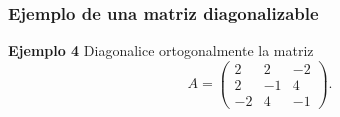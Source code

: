 \begin{frame}\frametitle{Ejemplo de una matriz diagonalizable}
	
	\begin{ej}{\textbf{Ejemplo 4}}
		Diagonalice ortogonalmente la matriz
		\[
		A =
		\left(
		\begin{array}{rrr}
			2 & 2 & -2 \\[1mm]
			2 & -1 & 4 \\[1mm]
			-2 & 4 & -1
		\end{array}
		\right).
		\]	
	\end{ej}
	
\end{frame}


\subsection{}

